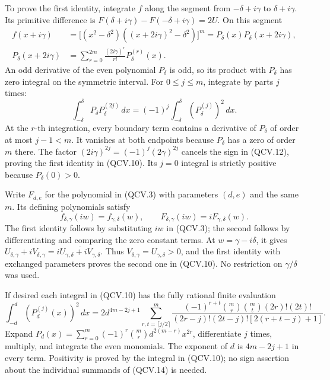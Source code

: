 To prove the first identity, integrate \(f\) along the segment from
\(-\delta+i\gamma\) to \(\delta+i\gamma\). Its primitive difference
is \(F(\delta+i\gamma)-F(-\delta+i\gamma)=2U\). On this segment
\[
 \begin{split}
 f(x+i\gamma)
  &=\bigl[(x^2-\delta^2)((x+2i\gamma)^2-\delta^2)\bigr]^m
    =P_\delta(x)P_\delta(x+2i\gamma),\\
 P_\delta(x+2i\gamma)
  &=\sum_{r=0}^{2m}\frac{(2i\gamma)^r}{r!}P_\delta^{(r)}(x).
 \end{split}
 \tag{QCV.11}
\]
An odd derivative of the even polynomial \(P_\delta\) is odd,
so its product with \(P_\delta\) has zero integral on the symmetric
interval. For \(0\leq j\leq m\), integrate by parts \(j\) times:
\[
 \int_{-\delta}^{\delta}P_\delta P_\delta^{(2j)}\,dx
   =(-1)^j\int_{-\delta}^{\delta}(P_\delta^{(j)})^2\,dx.
 \tag{QCV.12}
\]
At the \(r\)-th integration, every boundary term contains a derivative
of \(P_\delta\) of order at most \(j-1<m\). It vanishes at both
endpoints because \(P_\delta\) has a zero of order \(m\) there.
The factor \((2i\gamma)^{2j}=(-1)^j(2\gamma)^{2j}\) cancels
the sign in (QCV.12), proving the first identity in (QCV.10).
Its \(j=0\) integral is strictly positive because \(P_\delta(0)>0\).

Write \(F_{d,e}\) for the polynomial in (QCV.3) with parameters
\((d,e)\) and the same \(m\). Its defining polynomials satisfy
\[
 f_{\delta,\gamma}(iw)=f_{\gamma,\delta}(w),\qquad
 F_{\delta,\gamma}(iw)=iF_{\gamma,\delta}(w).
 \tag{QCV.13}
\]
The first identity follows by substituting \(iw\) in (QCV.3);
the second follows by differentiating and comparing the zero
constant terms. At \(w=\gamma-i\delta\), it gives
\(U_{\delta,\gamma}+iV_{\delta,\gamma}
 =i\overline{U_{\gamma,\delta}+iV_{\gamma,\delta}}\).
Thus \(V_{\delta,\gamma}=U_{\gamma,\delta}>0\), and the first
identity with exchanged parameters proves the second one in
(QCV.10). No restriction on \(\gamma/\delta\) was used.

If desired each integral in (QCV.10) has the fully rational finite
evaluation
\[
 \int_{-d}^{d}(P_d^{(j)}(x))^2\,dx
 =2d^{4m-2j+1}
 \sum_{r,t=\lceil j/2\rceil}^{m}
 \frac{(-1)^{r+t}\binom mr\binom mt(2r)!(2t)!}
 {(2r-j)!(2t-j)![2(r+t-j)+1]}.
 \tag{QCV.14}
\]
Expand \(P_d(x)=\sum_{r=0}^m(-1)^r\binom mr d^{2(m-r)}x^{2r}\),
differentiate \(j\) times, multiply, and integrate the even monomials.
The exponent of \(d\) is \(4m-2j+1\) in every term. Positivity is
proved by the integral in (QCV.10); no sign assertion about the
individual summands of (QCV.14) is needed.

